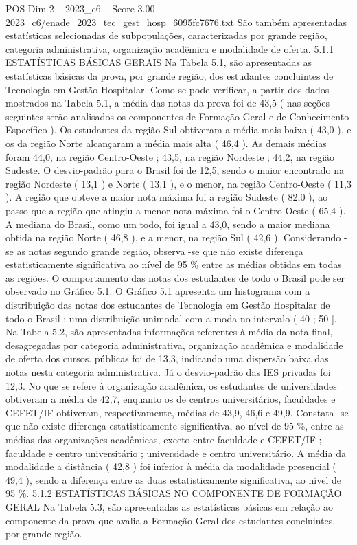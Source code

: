 \begin{textsample}{POS Dim 2 – 2023\_c6 – Score 3.00 – 2023\_c6/enade\_2023\_tec\_gest\_hosp\_6095fc7676.txt}
São também apresentadas estatísticas selecionadas de subpopulações, caracterizadas por grande região, categoria administrativa, organização acadêmica e modalidade de oferta. 5.1.1 ESTATÍSTICAS BÁSICAS GERAIS Na Tabela 5.1, são apresentadas as estatísticas básicas da prova, por grande região, dos estudantes concluintes de Tecnologia em Gestão Hospitalar.
Como se pode verificar, a partir dos dados mostrados na Tabela 5.1, a média das notas da prova foi de 43,5 ( nas seções seguintes serão analisados os componentes de Formação Geral e de Conhecimento Específico ).
Os estudantes da região Sul obtiveram a média mais baixa ( 43,0 ), e os da região Norte alcançaram a média mais alta ( 46,4 ).
As demais médias foram 44,0, na região Centro-Oeste ; 43,5, na região Nordeste ; 44,2, na região Sudeste.
O desvio-padrão para o Brasil foi de 12,5, sendo o maior encontrado na região Nordeste ( 13,1 ) e Norte ( 13,1 ), e o menor, na região Centro-Oeste ( 11,3 ).
A região que obteve a maior nota máxima foi a região Sudeste ( 82,0 ), ao passo que a região que atingiu a menor nota máxima foi o Centro-Oeste ( 65,4 ).
A mediana do Brasil, como um todo, foi igual a 43,0, sendo a maior mediana obtida na região Norte ( 46,8 ), e a menor, na região Sul ( 42,6 ).
Considerando -se as notas segundo grande região, observa -se que não existe diferença estatisticamente significativa ao nível de 95 \% entre as médias obtidas em todas as regiões.
O comportamento das notas dos estudantes de todo o Brasil pode ser observado no Gráfico 5.1.
O Gráfico 5.1 apresenta um histograma com a distribuição das notas dos estudantes de Tecnologia em Gestão Hospitalar de todo o Brasil : uma distribuição unimodal com a moda no intervalo ( 40 ; 50 ].
Na Tabela 5.2, são apresentadas informações referentes à média da nota final, desagregadas por categoria administrativa, organização acadêmica e modalidade de oferta dos cursos. públicas foi de 13,3, indicando uma dispersão baixa das notas nesta categoria administrativa.
Já o desvio-padrão das IES privadas foi 12,3.
No que se refere à organização acadêmica, os estudantes de universidades obtiveram a média de 42,7, enquanto os de centros universitários, faculdades e CEFET/IF obtiveram, respectivamente, médias de 43,9, 46,6 e 49,9.
Constata -se que não existe diferença estatisticamente significativa, ao nível de 95 \%, entre as médias das organizações acadêmicas, exceto entre faculdade e CEFET/IF ; faculdade e centro universitário ; universidade e centro universitário.
A média da modalidade a distância ( 42,8 ) foi inferior à média da modalidade presencial ( 49,4 ), sendo a diferença entre as duas estatisticamente significativa, ao nível de 95 \%. 5.1.2 ESTATÍSTICAS BÁSICAS NO COMPONENTE DE FORMAÇÃO GERAL Na Tabela 5.3, são apresentadas as estatísticas básicas em relação ao componente da prova que avalia a Formação Geral dos estudantes concluintes, por grande região.

\end{textsample}
